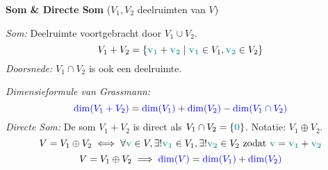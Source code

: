 \documentclass[12pt]{article}
\renewcommand{\vec}[1]{\textcolor{vectorTeal}{\mathbf{#1}}}
\newcommand{\scalar}[1]{\textcolor{scalarBrightBlue}{#1}}
\begin{document}
\vspace{1.5em} %
{\centering
\textcolor{headerBrown}{\large\textbf{Som & Directe Som}} ($V_1, V_2$ deelruimten van $V$)
\par
}%
\textit{Som:} Deelruimte voortgebracht door $V_1 \cup V_2$.
\[
V_1 + V_2 = \{ \vec{v_1} + \vec{v_2} \mid \vec{v_1} \in V_1, \vec{v_2} \in V_2 \}
\]
\textit{Doorsnede:} $V_1 \cap V_2$ is ook een deelruimte.

\textit{Dimensieformule van Grassmann:}
\[
\scalar{\dim(V_1 + V_2)} = \scalar{\dim(V_1)} + \scalar{\dim(V_2)} - \scalar{\dim(V_1 \cap V_2)}
\]
\textit{Directe Som:} De som $V_1 + V_2$ is direct als $V_1 \cap V_2 = \{\vec{0}\}$. Notatie: $V_1 \oplus V_2$.
\[
V = V_1 \oplus V_2 \iff \forall \vec{v} \in V, \exists! \vec{v_1} \in V_1, \exists! \vec{v_2} \in V_2 \text{ zodat } \vec{v} = \vec{v_1} + \vec{v_2}
\]
\[
V = V_1 \oplus V_2 \implies \scalar{\dim(V)} = \scalar{\dim(V_1)} + \scalar{\dim(V_2)}
\]
\end{document}
